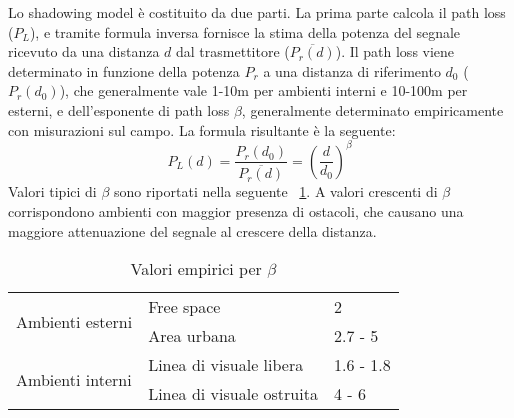 Lo shadowing model è costituito da due parti. La prima parte calcola il path loss ($P_L$), e tramite formula inversa fornisce la stima della potenza del segnale ricevuto da una distanza $d$ dal trasmettitore ($\overline{P_r(d)}$). Il path loss viene determinato in funzione della potenza $P_r$ a una distanza di riferimento $d_0$ (${P_r(d_0)}$), che generalmente vale 1-10m per ambienti interni e 10-100m per esterni, e dell'esponente di path loss $\beta$, generalmente determinato empiricamente con misurazioni sul campo. La formula risultante è la seguente:
%
\begin{equation*} \label{eq:pathloss}
	P_L(d) = \frac{P_r(d_0)}{\overline{P_r(d)}} = \left(\frac{d}{d_0}\right)^\beta 
\end{equation*} 
% 
Valori tipici di $\beta$ sono riportati nella seguente \tablename\ \ref{tab:beta}. A valori crescenti di $\beta$ corrispondono ambienti con maggior presenza di ostacoli, che causano una maggiore attenuazione del segnale al crescere della distanza. 
 
\begin{table}[!h]
	\centering
	\begin{tabular}{@{}lll@{}}
		\toprule
		\multirow{2}{*}{Ambienti esterni} & Free space                & 2         \\ \cmidrule(l){2-3} 
		& Area urbana               & 2.7 - 5   \\ \midrule
		\multirow{2}{*}{Ambienti interni} & Linea di visuale libera   & 1.6 - 1.8 \\ \cmidrule(l){2-3} 
		& Linea di visuale ostruita & 4 - 6     \\ \bottomrule
	\end{tabular}
	\caption{Valori empirici per $\beta$} \label{tab:beta}
\end{table}


